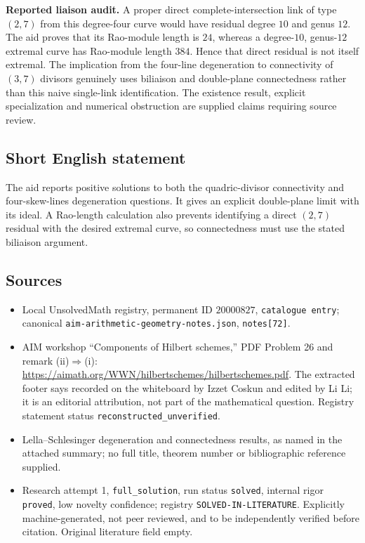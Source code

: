 \documentclass[11pt]{article}
\begin{document}
\textbf{Reported liaison audit.} A proper direct complete-intersection link of type $(2,7)$ from this degree-four curve would have residual degree $10$ and genus $12$. The aid proves that its Rao-module length is $24$, whereas a degree-$10$, genus-$12$ extremal curve has Rao-module length $384$. Hence that direct residual is not itself extremal. The implication from the four-line degeneration to connectivity of $(3,7)$ divisors genuinely uses biliaison and double-plane connectedness rather than this naive single-link identification. The existence result, explicit specialization and numerical obstruction are supplied claims requiring source review.
\subsection{Short English statement}
The aid reports positive solutions to both the quadric-divisor connectivity and four-skew-lines degeneration questions. It gives an explicit double-plane limit with its ideal. A Rao-length calculation also prevents identifying a direct $(2,7)$ residual with the desired extremal curve, so connectedness must use the stated biliaison argument.
\subsection{Sources}
\begin{itemize}
\item Local UnsolvedMath registry, permanent ID $20000827$, \texttt{catalogue entry}; canonical \texttt{aim-arithmetic-geometry-notes.json}, \texttt{notes[72]}.
\item AIM workshop ``Components of Hilbert schemes,'' PDF Problem 26 and remark (ii)$\Rightarrow$(i): \url{https://aimath.org/WWN/hilbertschemes/hilbertschemes.pdf}. The extracted footer says recorded on the whiteboard by Izzet Coskun and edited by Li Li; it is an editorial attribution, not part of the mathematical question. Registry statement status \texttt{reconstructed\_unverified}.
\item Lella--Schlesinger degeneration and connectedness results, as named in the attached summary; no full title, theorem number or bibliographic reference supplied.
\item Research attempt 1, \texttt{full\_solution}, run status \texttt{solved}, internal rigor \texttt{proved}, low novelty confidence; registry \texttt{SOLVED-IN-LITERATURE}. Explicitly machine-generated, not peer reviewed, and to be independently verified before citation. Original literature field empty.
\end{itemize}
\end{document}
